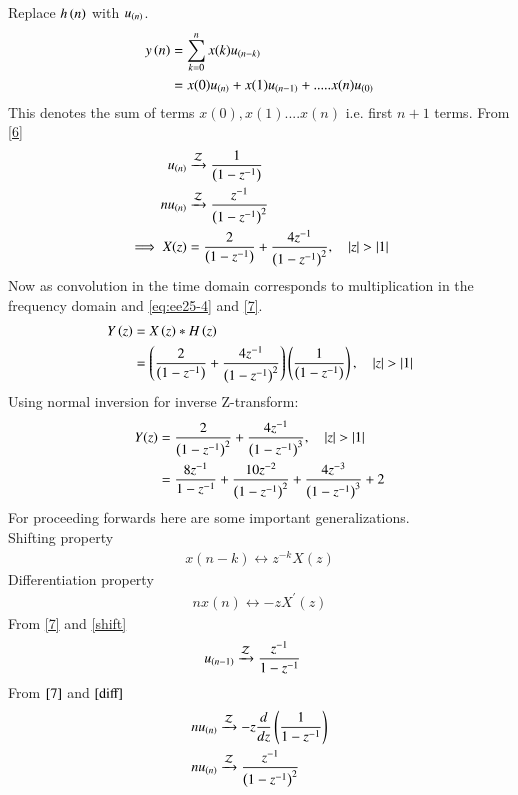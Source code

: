 \documentclass[journal,12pt,onecolumn]{IEEEtran}
\theoremstyle{remark}
\begin{document}
Replace $h\left(n\right)$ with $u_{\left(n\right)}$.
\begin{align}
    y\left(n\right) &= \sum_{k=0}^{n} x(k)u_{\left(n-k\right)}\\
    &=x(0)u_{\left(n\right)} + x(1)u_{\left(n-1\right)} + ..... x(n)u_{\left(0\right)}
\end{align}
This denotes the sum of terms $x(0),x(1)....x(n)$ i.e. first $n+1$ terms. From \eqref{6}\\
\begin{align}
    u_{\left(n\right)} &\xrightarrow{\mathcal{Z}} \frac{1}{\left(1-z^{-1}\right)} \label{7}\\
nu_{\left(n\right)} &\xrightarrow{\mathcal{Z}} \frac{z^{-1}}{\left(1-z^{-1}\right)^{2}}\\
  \implies  X(z)&= \frac{2}{\left(1-z^{-1}\right)} + \frac{4z^{-1}}{\left(1-z^{-1}\right)^{2}} \label{eq:ee25-4}
,\quad \left\vert z\right\vert>\left\vert1\right\vert 
\end{align}
Now as convolution in the time domain corresponds to multiplication in the frequency domain and \eqref{eq:ee25-4} and \eqref{7}.
\begin{align}
    Y\left(z\right) &= X\left(z\right) * H\left(z\right)\\
 &= \left(\frac{2}{\left(1-z^{-1}\right)} +
\frac{4z^{-1}}{\left(1-z^{-1}\right)^{2}}\right)\left(\frac{1}{\left(1-z^{-1}\right)}\right)
,\quad \left\vert z\right\vert>\left\vert1\right\vert     
\end{align}
Using normal inversion for inverse Z-transform:
\begin{align}
 Y(z) &= \frac{2}{\left(1-z^{-1}\right)^2} +
\frac{4z^{-1}}{\left(1-z^{-1}\right)^{3}}
,\quad \left\vert z\right\vert>\left\vert1\right\vert\\
   &= \frac{8z^{-1}}{1-z^{-1}} + \frac{10z^{-2}}{\left(1-z^{-1}\right)^2} + \frac{4z^{-3}}{\left(1-z^{-1}\right)^{3}} + 2\label{final}
\end{align}
For proceeding forwards here are some important generalizations.\\
Shifting property
\begin{align}
x(n-k) \leftrightarrow z^{-k} X(z) \label{shift}
\end{align}
Differentiation property
\begin{align}
nx(n) \leftrightarrow -zX^{\prime}(z) \label{diff}
\end{align}
From \eqref{7} and \eqref{shift}
\begin{align}
u_{\left(n-1\right)} &\xrightarrow{\mathcal{Z}} \frac{z^{-1}}{1-z^{-1}}
\end{align}
From $\eqref{7}$ and $\eqref{diff}$
\begin{align}
nu_{\left(n\right)} &\xrightarrow{\mathcal{Z}} -z\frac{d}{dz}\left(\frac{1}{1-z^{-1}}\right)\\
nu_{\left(n\right)}    &\xrightarrow{\mathcal{Z}} \frac{z^{-1}}{\left(1-z^{-1}\right)^{2}}
\end{align}
\end{document}
